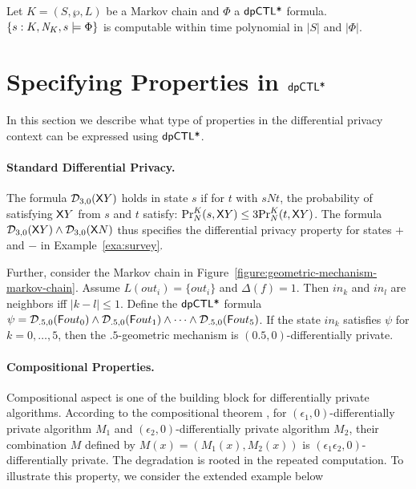 \begin{corollary}
  Let $K = (S, \wp, L)$ be a Markov chain and $\Phi$ a $\dpCTL$
  formula. $\{ s : K, \neighbor{K}, s \models \Phi \}$ is
  computable within time polynomial in $|S|$ and $|\Phi|$.
\end{corollary}


\section{Specifying Properties in $\dpCTL$}
In this section we describe what type of properties in the differential privacy context can be expressed using $\dpCTL$.

\paragraph{Standard Differential Privacy.} 
The formula $\dpriv{3}{0} (\X Y)$ holds in state $s$ if for  $t$ with $sNt$, the probability of satisfying $\X Y$ from $s$ and $t$ satisfy:
$\myPr{s}{K}{N}{\X Y}\le 3\myPr{t}{K}{N}{\X Y}$. The formula $\dpriv{3}{0} (\X Y)\wedge \dpriv{3}{0} (\X N)$ thus specifies the differential privacy property for states $+$ and $-$ in Example~\ref{exa:survey}.

Further, consider the Markov chain in
Figure~\ref{figure:geometric-mechanism-markov-chain}. Assume
$L(out_i) = \{ out_i \}$ and $\Delta (f) = 1$. Then $in_k$ and $in_l$ are
neighbors iff $| k - l | \leq 1$. Define the $\dpCTL$ formula
$\psi = \dpriv{.5}{0} (\F out_0) \wedge \dpriv{.5}{0} (\F out_1) \wedge
\cdots \wedge \dpriv{.5}{0} (\F out_5)$. If the state $in_k$ satisfies
$\psi$ for $k = 0, \ldots, 5$, then the $.5$-geometric mechanism is
$(0.5, 0)$-differentially private.


\paragraph{Compositional Properties.}
Compositional aspect is one of the building block for differentially private algorithms. According to the compositional theorem \cite{}, for $(\epsilon_1,0)$-differentially private algorithm $M_1$ and
$(\epsilon_2,0)$-differentially private algorithm $M_2$, their combination $M$ defined by $M(x)=(M_1(x), M_2(x))$ is $(\epsilon_1\epsilon_2,0)$-differentially private. The degradation is rooted in the repeated computation. To illustrate this property, we consider the extended example below 

